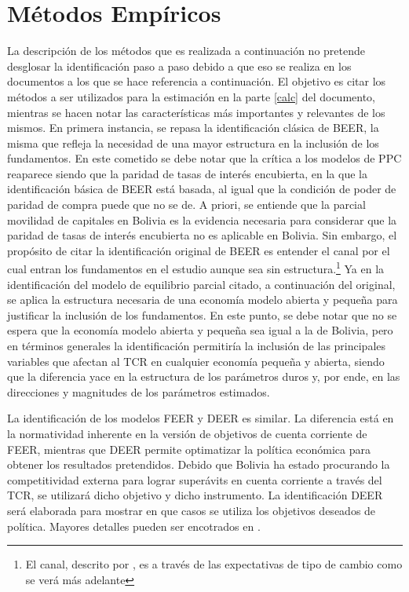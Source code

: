 \documentclass[12pt,letterpaper]{article}
\begin{document}

\section{Métodos Empíricos}\label{tcr}

La descripción de los métodos que es realizada a continuación no pretende desglosar la identificación paso a paso debido a que eso se realiza en los documentos a los que se hace referencia a continuación. El objetivo es citar los métodos a ser utilizados para la estimación en la parte \ref{calc} del documento, mientras se hacen notar las características más importantes y relevantes de los mismos. En primera instancia, se repasa la identificación clásica de BEER, la misma que refleja la necesidad de una mayor estructura en la inclusión de los fundamentos. En este cometido se debe notar que la crítica a los modelos de PPC reaparece siendo que la paridad de tasas de interés encubierta, en la que la identificación básica de BEER está basada, al igual que la condición de poder de paridad de compra puede que no se de. A priori, se entiende que la parcial movilidad de capitales en Bolivia es la evidencia necesaria para considerar que la paridad de tasas de interés encubierta no es aplicable en Bolivia. Sin embargo, el propósito de citar la identificación original de BEER es entender el canal por el cual entran los fundamentos en el estudio aunque sea sin estructura.\footnote{El canal, descrito por \cite{clark1999exchange}, es a través de las expectativas de tipo de cambio como se verá más adelante} Ya en la identificación del modelo de equilibrio parcial citado, a continuación del original, se aplica la estructura necesaria de una economía modelo abierta y pequeña para justificar la inclusión de los fundamentos. En este punto, se debe notar que no se espera que la economía modelo abierta y pequeña sea igual a la de Bolivia, pero en términos generales la identificación permitiría la inclusión de las principales variables que afectan al TCR en cualquier economía pequeña y abierta, siendo que la diferencia yace en la estructura de los parámetros duros y, por ende, en las direcciones y magnitudes de los parámetros estimados.

La identificación de los modelos FEER y DEER es similar. La diferencia está en la normatividad inherente en la versión de objetivos de cuenta corriente de FEER, mientras que DEER permite optimatizar la política económica para obtener los resultados pretendidos. Debido que Bolivia ha estado procurando la competitividad externa para lograr superávits en cuenta corriente a través del TCR, se utilizará dicho objetivo y dicho instrumento. La identificación DEER será elaborada para mostrar en que casos se utiliza los objetivos deseados de política. Mayores detalles pueden ser encotrados en \cite{james2012handbook}.		
\end{document}
